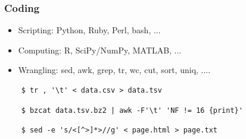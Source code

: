 \begin{frame}[fragile]
  \frametitle{Coding}

  \begin{itemize}
    \item Scripting: Python, Ruby, Perl, bash, ...
    \item Computing: R, SciPy/NumPy, MATLAB, ...
    \item Wrangling: sed, awk, grep, tr, wc, cut, sort, uniq, ....
  \end{itemize}

  \pause
  \begin{verbatim}
    $ tr , '\t' < data.csv > data.tsv
  \end{verbatim}

  \pause
  \begin{verbatim}
    $ bzcat data.tsv.bz2 | awk -F'\t' 'NF != 16 {print}'
  \end{verbatim}

  \pause
  \begin{verbatim}
    $ sed -e 's/<[^>]*>//g' < page.html > page.txt
  \end{verbatim}


\end{frame}
